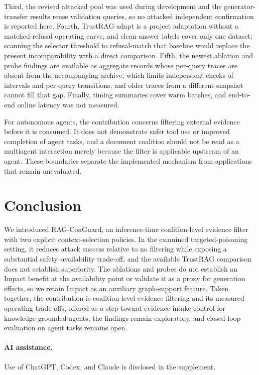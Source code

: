 \documentclass[sigconf]{aamas}
\begin{document}
Third, the revised attacked pool was used during development and the generator-transfer results reuse validation queries, so no attacked independent confirmation is reported here. Fourth, TrustRAG-adapt is a project adaptation without a matched-refusal operating curve, and clean-answer labels cover only one dataset; scanning the selector threshold to refusal-match that baseline would replace the present incomparability with a direct comparison. Fifth, the newest ablation and probe findings are available as aggregate records whose per-query traces are absent from the accompanying archive, which limits independent checks of intervals and per-query transitions, and older traces from a different snapshot cannot fill that gap. Finally, timing summaries cover warm batches, and end-to-end online latency was not measured.

For autonomous agents, the contribution concerns filtering external evidence before it is consumed. It does not demonstrate safer tool use or improved completion of agent tasks, and a document coalition should not be read as a multiagent interaction merely because the filter is applicable upstream of an agent. These boundaries separate the implemented mechanism from applications that remain unevaluated.

\section{Conclusion}
We introduced RAG-ConGuard, an inference-time coalition-level evidence filter with two explicit context-selection policies. In the examined targeted-poisoning setting, it reduces attack success relative to no filtering while exposing a substantial safety--availability trade-off, and the available TrustRAG comparison does not establish superiority. The ablations and probes do not establish an Impact benefit at the availability point or validate it as a proxy for generation effects, so we retain Impact as an auxiliary graph-support feature. Taken together, the contribution is coalition-level evidence filtering and its measured operating trade-offs, offered as a step toward evidence-intake control for knowledge-grounded agents; the findings remain exploratory, and closed-loop evaluation on agent tasks remains open.

\paragraph{AI assistance.}
Use of ChatGPT, Codex, and Claude is disclosed in the supplement.

\balance


\end{document}
